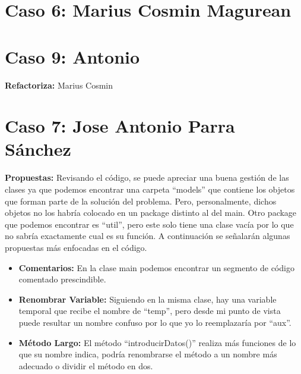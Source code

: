 \documentclass[11pt,a4paper,oneside]{book}
\begin{document}
\chapter {Caso 6: Marius Cosmin Magurean}


\chapter {Caso 9: Antonio}
\textbf{Refactoriza:} Marius Cosmin


\chapter {Caso 7: Jose Antonio Parra Sánchez}

\textbf{Propuestas: } Revisando el código, se puede apreciar una buena gestión de las clases ya que podemos encontrar una carpeta ``models'' que contiene los objetos que forman parte de la solución del problema. Pero, personalmente, dichos objetos no los habría colocado en un package distinto al del main. Otro package que podemos encontrar es ``util'', pero este solo tiene una clase vacía por lo que no sabría exactamente cual es su función. A continuación se señalarán algunas propuestas más enfocadas en el código.

\begin{itemize}
    \item \textbf{Comentarios: } En la clase main podemos encontrar un segmento de código comentado prescindible.
    
    
     \item \textbf{Renombrar Variable: } Siguiendo en la misma clase, hay una variable temporal que recibe el nombre de ``temp'', pero desde mi punto de vista puede resultar un nombre confuso por lo que yo lo reemplazaría por ``aux''.
     
     
      \item \textbf{Método Largo: } El método ``introducirDatos()'' realiza más funciones de lo que su nombre indica, podría renombrarse el método a un nombre más adecuado o dividir el método en dos.
          
  
\end{itemize}
\end{document}
